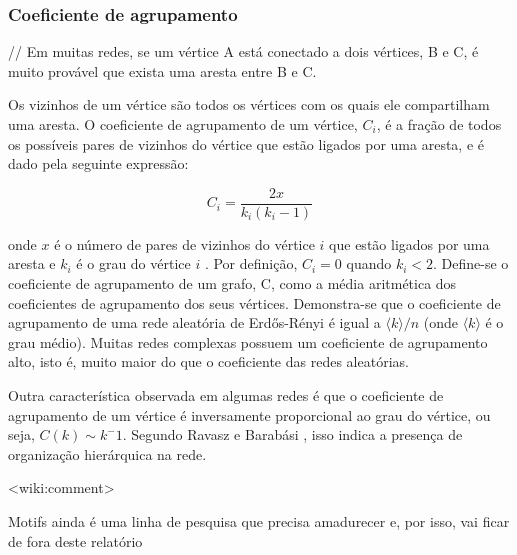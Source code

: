 \documentclass{article}
\begin{document}


\subsubsection{Coeficiente de agrupamento}


// Em muitas redes, se um vértice A está conectado a dois vértices, B e C, é muito provável que exista uma aresta entre B e C.

Os vizinhos de um vértice são todos os vértices com os quais ele compartilham uma aresta. O coeficiente de agrupamento de um vértice, $C_i$, é a fração de todos os possíveis pares de vizinhos do vértice que estão ligados por uma aresta, e é dado pela seguinte expressão:

\[  C_i = \frac{2x}{k_i(k_i - 1)} \]

onde $x$ é o número de pares de vizinhos do vértice $i$ que estão ligados por uma aresta e $k_i$ é o grau do vértice $i$ \cite{Watts1998}. Por definição, $C_i = 0$ quando $k_i < 2$. Define-se o coeficiente de agrupamento de um grafo, C, como a média aritmética dos coeficientes de agrupamento dos seus vértices. Demonstra-se que o coeficiente de agrupamento de uma rede aleatória de Erdős-Rényi é igual a $\langle k \rangle / n$ (onde $\langle k \rangle$ é o grau médio). Muitas redes complexas possuem um coeficiente de agrupamento alto, isto é, muito maior do que o coeficiente das redes aleatórias.

Outra característica observada em algumas redes é que o coeficiente de agrupamento de um vértice é inversamente proporcional ao grau do vértice, ou seja, $C(k) \sim k^-1$. Segundo Ravasz e Barabási \cite{Ravasz2003}, isso indica a presença de organização hierárquica na rede.

<wiki:comment>
	\cite{Valverde2005,Ma2008}
	

	Motifs ainda é uma linha de pesquisa que precisa amadurecer e, por isso, vai ficar de fora deste relatório
\end{document}
